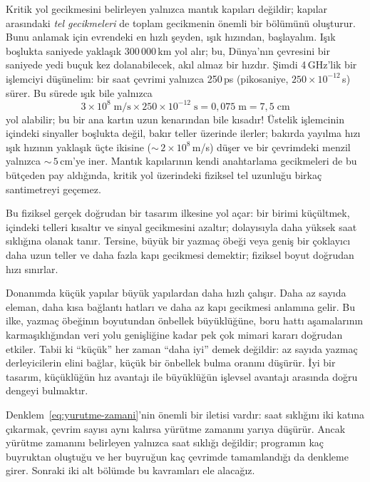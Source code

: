Kritik yol gecikmesini belirleyen yalnızca mantık kapıları değildir; kapılar arasındaki \emph{tel gecikmeleri} de toplam gecikmenin önemli bir bölümünü oluşturur. Bunu anlamak için evrendeki en hızlı şeyden, ışık hızından, başlayalım. Işık boşlukta saniyede yaklaşık 300\,000\,km yol alır; bu, Dünya'nın çevresini bir saniyede yedi buçuk kez dolanabilecek, akıl almaz bir hızdır. Şimdi 4\,GHz'lik bir işlemciyi düşünelim: bir saat çevrimi yalnızca 250\,ps (pikosaniye, $250 \times 10^{-12}$\,s) sürer. Bu sürede ışık bile yalnızca
%
\[
3 \times 10^{8}\;\text{m/s} \times 250 \times 10^{-12}\;\text{s} = 0{,}075\;\text{m} = 7{,}5\;\text{cm}
\]
%
yol alabilir; bu bir ana kartın uzun kenarından bile kısadır! Üstelik işlemcinin içindeki sinyaller boşlukta değil, bakır teller üzerinde ilerler; bakırda yayılma hızı ışık hızının yaklaşık üçte ikisine (${\sim}\,2 \times 10^{8}$\,m/s) düşer ve bir çevrimdeki menzil yalnızca ${\sim}\,5$\,cm'ye iner. Mantık kapılarının kendi anahtarlama gecikmeleri de bu bütçeden pay aldığında, kritik yol üzerindeki fiziksel tel uzunluğu birkaç santimetreyi geçemez.

Bu fiziksel gerçek doğrudan bir tasarım ilkesine yol açar: bir birimi küçültmek, içindeki telleri kısaltır ve sinyal gecikmesini azaltır; dolayısıyla daha yüksek saat sıklığına olanak tanır. Tersine, büyük bir yazmaç öbeği veya geniş bir çoklayıcı daha uzun teller ve daha fazla kapı gecikmesi demektir; fiziksel boyut doğrudan hızı sınırlar.

\begin{tanim}
Donanımda küçük yapılar büyük yapılardan daha hızlı çalışır. Daha az sayıda eleman, daha kısa bağlantı hatları ve daha az kapı gecikmesi anlamına gelir. Bu ilke, yazmaç öbeğinın boyutundan önbellek büyüklüğüne, boru hattı aşamalarının karmaşıklığından veri yolu genişliğine kadar pek çok mimari kararı doğrudan etkiler. Tabii ki ``küçük'' her zaman ``daha iyi'' demek değildir: az sayıda yazmaç derleyicilerin elini bağlar, küçük bir önbellek bulma oranını düşürür. İyi bir tasarım, küçüklüğün hız avantajı ile büyüklüğün işlevsel avantajı arasında doğru dengeyi bulmaktır.
\end{tanim}

Denklem~\ref{eq:yurutme-zamani}'nin önemli bir iletisi vardır: saat sıklığını iki katına çıkarmak, çevrim sayısı aynı kalırsa yürütme zamanını yarıya düşürür. Ancak yürütme zamanını belirleyen yalnızca saat sıklığı değildir; programın kaç buyruktan oluştuğu ve her buyruğun kaç çevrimde tamamlandığı da denkleme girer. Sonraki iki alt bölümde bu kavramları ele alacağız.


